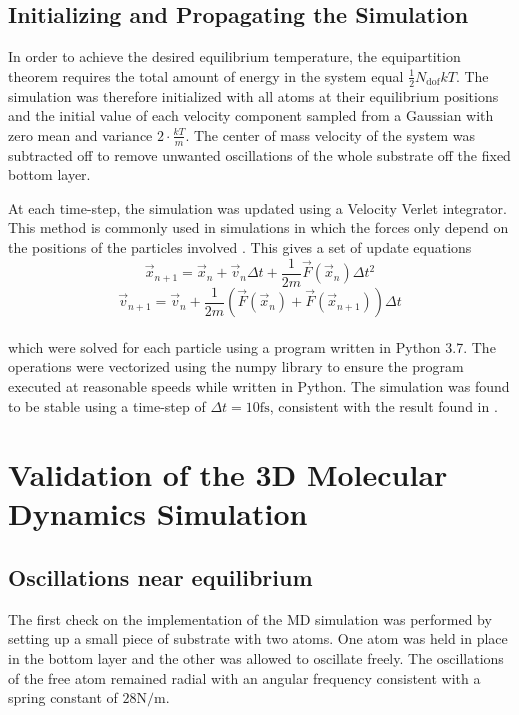 \subsection{Initializing and Propagating the Simulation}

In order to achieve the desired equilibrium temperature, the equipartition theorem requires the total amount of energy in the system equal $\frac{1}{2}N_{\text{dof}}kT$. The simulation was therefore initialized with all atoms at their equilibrium positions and the initial value of each velocity component sampled from a Gaussian with zero mean and variance $2 \cdot \frac{kT}{m}$. The center of mass velocity of the system was subtracted off to remove unwanted oscillations of the whole substrate off the fixed bottom layer.

At each time-step, the simulation was updated using a Velocity Verlet integrator. This method is commonly used in simulations in which the forces only depend on the positions of the particles involved \cite{Omelyan, Choi}. This gives a set of update equations
\\
$$
	\vec{x}_{n+1} = \vec{x}_n + \vec{v}_n \Delta{t} + \frac{1}{2m}\vec{F}\left(\vec{x}_n\right) \Delta{t}^2
$$
\begin{equation}
	\vec{v}_{n+1} = \vec{v}_n + \frac{1}{2m} \left(\vec{F}\left(\vec{x}_n\right) + \vec{F}\left(\vec{x}_{n+1}\right)\right) \Delta{t}
\end{equation}
\\
which were solved for each particle using a program written in Python 3.7. The operations were vectorized using the numpy library \cite{harris2020array} to ensure the program executed at reasonable speeds while written in Python. The simulation was found to be stable using a time-step of $\Delta{t}=10\si{\femto\second}$, consistent with the result found in \cite{ELLIS199499}. 

\section{Validation of the 3D Molecular Dynamics Simulation}

\subsection{Oscillations near equilibrium}

The first check on the implementation of the MD simulation was performed by setting up a small piece of substrate with two atoms. One atom was held in place in the bottom layer and the other was allowed to oscillate freely. The oscillations of the free atom remained radial with an angular frequency consistent with a spring constant of $28\si{\newton\per\metre}$.

